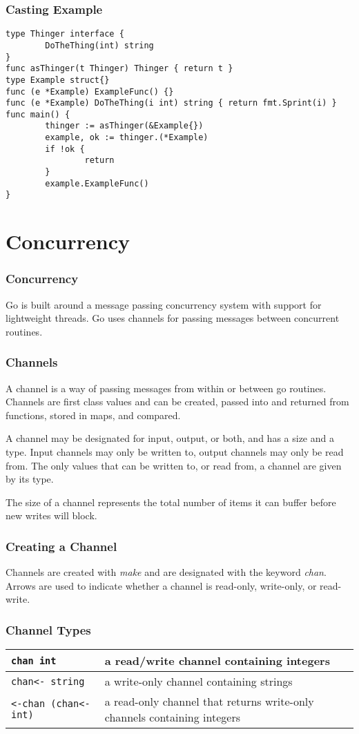 \documentclass{beamer}
\begin{document}
\begin{frame}[fragile]
  \frametitle{Casting Example}
\begin{lstlisting}[language=Golang]
type Thinger interface {
        DoTheThing(int) string
}
func asThinger(t Thinger) Thinger { return t }
type Example struct{}
func (e *Example) ExampleFunc() {}
func (e *Example) DoTheThing(i int) string { return fmt.Sprint(i) }
func main() {
        thinger := asThinger(&Example{})
        example, ok := thinger.(*Example)
        if !ok {
                return
        }
        example.ExampleFunc()
}
\end{lstlisting}
\end{frame}

\section{Concurrency}

\begin{frame}
  \frametitle{Concurrency}
  Go is built around a message passing concurrency system with support
  for lightweight threads.  Go uses channels for passing messages
  between concurrent routines.
\end{frame}

\begin{frame}
  \frametitle{Channels}
  A channel is a way of passing messages from within or between go
  routines.  Channels are first class values and can be created,
  passed into and returned from functions, stored in maps, and
  compared.

  A channel may be designated for input, output, or both, and has a
  size and a type.  Input channels may only be written to, output
  channels may only be read from.  The only values that can be written
  to, or read from, a channel are given by its type.

  The size of a channel represents the total number of items it can
  buffer before new writes will block.
\end{frame}

\begin{frame}[fragile]
  \frametitle{Creating a Channel}
  Channels are created with \emph{make} and are designated with the
  keyword \emph{chan}.  Arrows are used to indicate whether a channel
  is read-only, write-only, or read-write.
\end{frame}

\begin{frame}[fragile]
  \frametitle{Channel Types}
  \begin{tabular}{|p{2in}|p{1.5in}|}
    \hline
    \verb!chan int! & a read/write channel containing integers \\
    \hline
    \verb!chan<- string! & a write-only channel containing strings \\
    \hline
    \verb!<-chan (chan<- int)! & a read-only channel that returns write-only channels containing integers \\
    \hline
  \end{tabular}
\end{frame}
\end{document}
